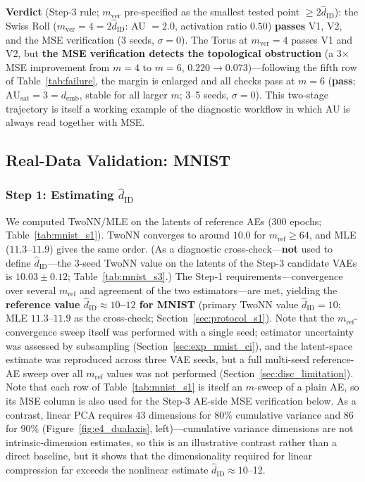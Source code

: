 \documentclass[make,article,submit,pdftex,moreauthors]{Definitions/mdpi}
\newcommand{\hatdID}{\hat{d}_{\mathrm{ID}}}
\newcommand{\AUsat}{\mathrm{AU}_{\mathrm{sat}}}
\newcommand{\demb}{d_{\mathrm{emb}}}
\begin{document}
\textbf{Verdict} (Step-3 rule; $m_{\mathrm{ver}}$ pre-specified as the
smallest tested point $\geq 2\hatdID$): the Swiss Roll
($m_{\mathrm{ver}} = 4 = 2\hatdID$: AU $= 2.0$, activation ratio $0.50$)
\textbf{passes} V1, V2, and the MSE verification (3 seeds, $\sigma = 0$).
The Torus at $m_{\mathrm{ver}} = 4$ passes V1 and V2, but \textbf{the MSE
verification detects the topological obstruction} (a 3$\times$ MSE
improvement from $m = 4$ to $m = 6$, $0.220 \to 0.073$)---following the
fifth row of Table~\ref{tab:failure}, the margin is enlarged and all
checks pass at $m = 6$ (\textbf{pass}; $\AUsat = 3 = \demb$, stable for
all larger $m$; 3--5 seeds, $\sigma = 0$).
This two-stage trajectory is itself a working example of the diagnostic
workflow in which AU is always read together with MSE.

\subsection{Real-Data Validation: MNIST}\label{sec:exp_mnist}

\subsubsection{Step 1: Estimating $\hatdID$}

We computed TwoNN/MLE on the latents of reference AEs (300 epochs;
Table~\ref{tab:mnist_s1}).
TwoNN converges to around $10.0$ for $m_{\mathrm{ref}} \geq 64$, and MLE
($11.3$--$11.9$) gives the same order.
(As a diagnostic cross-check---\textbf{not} used to define $\hatdID$---the
3-seed TwoNN value on the latents of the Step-3 candidate VAEs is
$10.03 \pm 0.12$; Table~\ref{tab:mnist_s3}.)
The Step-1 requirements---convergence over several $m_{\mathrm{ref}}$ and
agreement of the two estimators---are met, yielding the
\textbf{reference value $\hatdID \approx 10$--$12$ for MNIST}
(primary TwoNN value $\hatdID = 10$; MLE $11.3$--$11.9$ as the
cross-check; Section~\ref{sec:protocol_s1}).
Note that the $m_{\mathrm{ref}}$-convergence sweep itself was performed
with a single seed; estimator uncertainty was assessed by subsampling
(Section~\ref{sec:exp_mnist_ci}), and the latent-space estimate was
reproduced across three VAE seeds, but a full multi-seed reference-AE sweep
over all $m_{\mathrm{ref}}$ values was not performed
(Section~\ref{sec:disc_limitation}).
Note that each row of Table~\ref{tab:mnist_s1} is itself an $m$-sweep of a
plain AE, so its MSE column is also used for the Step-3 AE-side MSE
verification below.
As a contrast, linear PCA requires 43 dimensions for 80\% cumulative
variance and 86 for 90\% (Figure~\ref{fig:e4_dualaxis}, left)---cumulative
variance dimensions are not intrinsic-dimension estimates, so this is an
illustrative contrast rather than a direct baseline, but it shows that the
dimensionality required for linear compression far exceeds the nonlinear
estimate $\hatdID \approx 10$--12.
\end{document}
